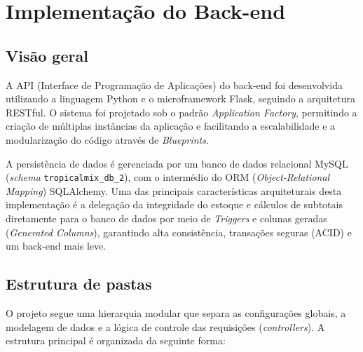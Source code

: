 \section{Implementação do Back-end}

\subsection{Visão geral}

A API (Interface de Programação de Aplicações) do back-end foi desenvolvida utilizando a linguagem Python e o microframework Flask, seguindo a arquitetura RESTful. O sistema foi projetado sob o padrão \textit{Application Factory}, permitindo a criação de múltiplas instâncias da aplicação e facilitando a escalabilidade e a modularização do código através de \textit{Blueprints}.

A persistência de dados é gerenciada por um banco de dados relacional MySQL (\textit{schema} \texttt{tropicalmix\_db\_2}), com o intermédio do ORM (\textit{Object-Relational Mapping}) SQLAlchemy. Uma das principais características arquiteturais desta implementação é a delegação da integridade do estoque e cálculos de subtotais diretamente para o banco de dados por meio de \textit{Triggers} e colunas geradas (\textit{Generated Columns}), garantindo alta consistência, transações seguras (ACID) e um back-end mais leve.

\subsection{Estrutura de pastas}

O projeto segue uma hierarquia modular que separa as configurações globais, a modelagem de dados e a lógica de controle das requisições (\textit{controllers}). A estrutura principal é organizada da seguinte forma:

